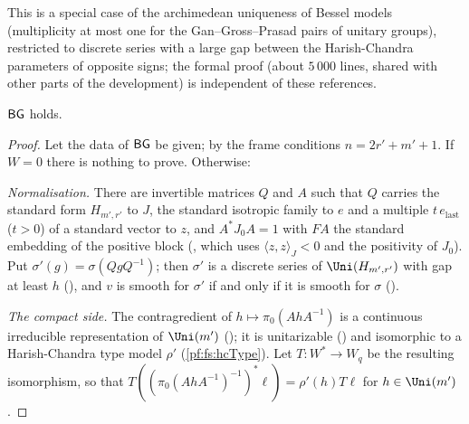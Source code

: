 This is a special case of the archimedean uniqueness of Bessel models \cite{JiangSunZhu2010,SunZhu2012} (multiplicity at most one
for the Gan--Gross--Prasad pairs of unitary groups), restricted to discrete series with a large gap between the Harish-Chandra parameters
of opposite signs; the formal proof (about $5\,000$ lines, shared with other parts of the development) is independent of these
references.

\begin{proposition}\label{pf:fs:burGapPos}
$\mathsf{BG}$ holds.
\end{proposition}

\begin{proof}
Let the data of $\mathsf{BG}$ be given; by the frame conditions $n=2r'+m'+1$. If $W=0$ there is nothing to prove. Otherwise:

\emph{Normalisation.} There are invertible matrices $Q$ and $A$ such that $Q$ carries the standard form $H_{m',r'}$ to $J$, the standard
isotropic family to $e$ and a multiple $t\,e_{\mathrm{last}}$ ($t>0$) of a standard vector to $z$, and $A^*J_0A=1$ with $FA$ the standard
embedding of the positive block (, which uses $\langle z,z\rangle_J<0$ and the
positivity of $J_0$). Put $\sigma'(g)=\sigma(QgQ^{-1})$; then $\sigma'$ is a discrete series of $\Uni(H_{m',r'})$ with gap at least $h$
(), and $v$ is smooth for $\sigma'$ if and only if it is smooth for $\sigma$
().

\emph{The compact side.} The contragredient of $h\mapsto\pi_0(AhA^{-1})$ is a continuous irreducible representation of $\Uni(m')$
(); it is unitarizable
() and isomorphic to a Harish-Chandra type model $\rho'$
(\cref{pf:fs:hcType}). Let $T\colon W^*\to W_q$ be the resulting isomorphism, so
that $T((\pi_0(AhA^{-1})^{-1})^*\ell)=\rho'(h)T\ell$ for $h\in\Uni(m')$.


\end{proof}
